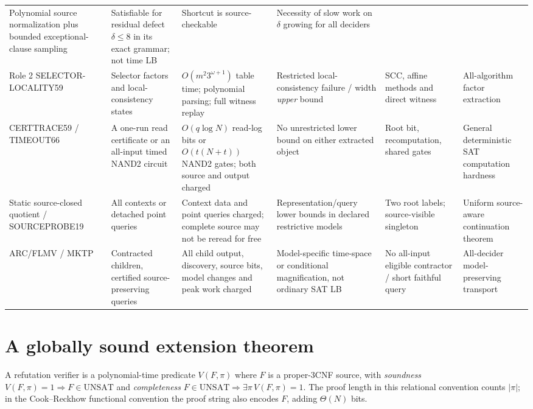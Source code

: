\documentclass[11pt]{article}
\begin{document}
\begin{longtable}{p{.12\linewidth}p{.145\linewidth}p{.245\linewidth}p{.15\linewidth}p{.14\linewidth}p{.13\linewidth}}
Polynomial source normalization plus bounded exceptional-clause sampling &
Satisfiable for residual defect $\delta\le 8$ in its exact grammar; not time LB &
Shortcut is source-checkable &
Necessity of slow work on $\delta$ growing for all deciders\\
Role 2 SELECTOR-LOCALITY59 &
Selector factors and local-consistency states &
$O(m^2 3^{\omega+1})$ table time; polynomial parsing; full witness replay &
Restricted local-consistency failure / width \emph{upper} bound &
SCC, affine methods and direct witness &
All-algorithm factor extraction\\
CERTTRACE59 / TIMEOUT66 &
A one-run read certificate or an all-input timed NAND2 circuit &
$O(q\log N)$ read-log bits or $O(t(N+t))$ NAND2 gates; both source and output charged &
No unrestricted lower bound on either extracted object &
Root bit, recomputation, shared gates &
General deterministic SAT computation hardness\\
Static source-closed quotient / SOURCEPROBE19 &
All contexts or detached point queries &
Context data and point queries charged; complete source may not be reread for free &
Representation/query lower bounds in declared restrictive models &
Two root labels; source-visible singleton &
Uniform source-aware continuation theorem\\
ARC/FLMV / MKTP &
Contracted children, certified source-preserving queries &
All child output, discovery, source bits, model changes and peak work charged &
Model-specific time-space or conditional magnification, not ordinary SAT LB &
No all-input eligible contractor / short faithful query &
All-decider model-preserving transport\\
\bottomrule
\end{longtable}
\normalsize

\section{A globally sound extension theorem}
A refutation verifier is a polynomial-time predicate $V(F,\pi)$
where $F$ is a proper-3CNF source, with \emph{soundness}
$V(F,\pi)=1\Rightarrow F\in\mathrm{UNSAT}$ and
\emph{completeness}
$F\in\mathrm{UNSAT}\Rightarrow \exists\pi\,V(F,\pi)=1$.
The proof length in this relational convention counts $|\pi|$;
in the Cook--Reckhow functional convention the proof string also
encodes $F$, adding $\Theta(N)$ bits.
\end{document}
